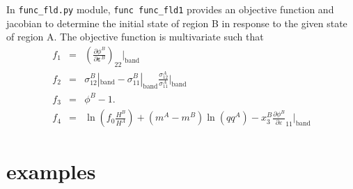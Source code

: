 \documentclass[12pt]{amsart}
\begin{document}
In \verb|func_fld.py| module, \verb|func func_fld1| provides an objective function and jacobian to determine the initial state of region B in response to the given state of region A.
The objective function is multivariate such that
\begin{eqnarray}
  \label{eq:objf_func_fld1}
  f_1& =& (\frac{\partial \phi^B}{\partial \boldsymbol{\varepsilon}^B})_{22}|_\text{band}\\
  f_2& =& \sigma_{12}^B|_\text{band}- \sigma_{11}^B|_\text{band} \frac{\sigma_{12}^A}{\sigma_{11}^A}|_\text{band}\\
  f_3& =& \phi^B- 1. \\
  f_4& =& \ln(f_0 \frac{H^B}{H^A}) + (m^A-m^B) \ln(qq^A) - x_3^B \frac{\partial \phi^B}{\partial \varepsilon}_{11}|_\text{band}
\end{eqnarray}
%

% 
%




\section{examples}
\end{document}
